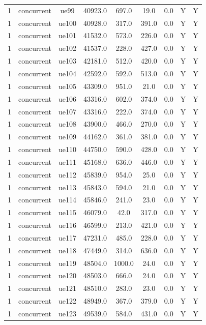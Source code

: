 \begin{table}[ht]
\begin{tabular}{|c|c|c|c|c|c|c|c|c|}
1 & concurrent & ue99 & 40923.0 & 697.0 & 19.0 & 0.0 & Y & Y \\
1 & concurrent & ue100 & 40928.0 & 317.0 & 391.0 & 0.0 & Y & Y \\
1 & concurrent & ue101 & 41532.0 & 573.0 & 226.0 & 0.0 & Y & Y \\
1 & concurrent & ue102 & 41537.0 & 228.0 & 427.0 & 0.0 & Y & Y \\
1 & concurrent & ue103 & 42181.0 & 512.0 & 420.0 & 0.0 & Y & Y \\
1 & concurrent & ue104 & 42592.0 & 592.0 & 513.0 & 0.0 & Y & Y \\
1 & concurrent & ue105 & 43309.0 & 951.0 & 21.0 & 0.0 & Y & Y \\
1 & concurrent & ue106 & 43316.0 & 602.0 & 374.0 & 0.0 & Y & Y \\
1 & concurrent & ue107 & 43316.0 & 222.0 & 374.0 & 0.0 & Y & Y \\
1 & concurrent & ue108 & 43900.0 & 466.0 & 270.0 & 0.0 & Y & Y \\
1 & concurrent & ue109 & 44162.0 & 361.0 & 381.0 & 0.0 & Y & Y \\
1 & concurrent & ue110 & 44750.0 & 590.0 & 428.0 & 0.0 & Y & Y \\
1 & concurrent & ue111 & 45168.0 & 636.0 & 446.0 & 0.0 & Y & Y \\
1 & concurrent & ue112 & 45839.0 & 954.0 & 25.0 & 0.0 & Y & Y \\
1 & concurrent & ue113 & 45843.0 & 594.0 & 21.0 & 0.0 & Y & Y \\
1 & concurrent & ue114 & 45846.0 & 241.0 & 23.0 & 0.0 & Y & Y \\
1 & concurrent & ue115 & 46079.0 & 42.0 & 317.0 & 0.0 & Y & Y \\
1 & concurrent & ue116 & 46599.0 & 213.0 & 421.0 & 0.0 & Y & Y \\
1 & concurrent & ue117 & 47231.0 & 485.0 & 228.0 & 0.0 & Y & Y \\
1 & concurrent & ue118 & 47449.0 & 314.0 & 636.0 & 0.0 & Y & Y \\
1 & concurrent & ue119 & 48504.0 & 1000.0 & 24.0 & 0.0 & Y & Y \\
1 & concurrent & ue120 & 48503.0 & 666.0 & 24.0 & 0.0 & Y & Y \\
1 & concurrent & ue121 & 48510.0 & 283.0 & 23.0 & 0.0 & Y & Y \\
1 & concurrent & ue122 & 48949.0 & 367.0 & 379.0 & 0.0 & Y & Y \\
1 & concurrent & ue123 & 49539.0 & 584.0 & 431.0 & 0.0 & Y & Y \\

\end{tabular}
\end{table}
